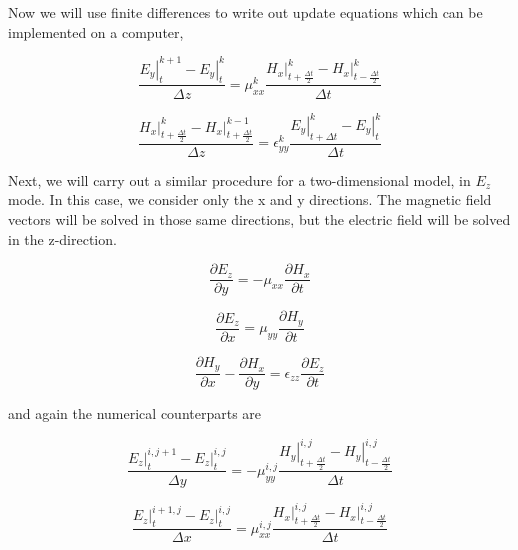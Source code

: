 \documentclass[a4paper]{article}
\begin{document}
Now we will use finite differences to write out update equations which can be implemented on a computer, 

\begin{equation}
    \frac{\left. E_y \right\vert_t^{k+1} - \left. E_y \right\vert_t^{k}}{\Delta z} = \mu_{xx}^{k} \frac{\left. H_x \right\vert_{t+\frac{\Delta t}{2}}^{k} - \left. H_x \right\vert_{t-\frac{\Delta t}{2}}^{k}}{\Delta t}
\end{equation}

\begin{equation}
    \frac{\left. H_x \right\vert_{t+\frac{\Delta t}{2}}^{k} - \left. H_x \right\vert_{t+\frac{\Delta t}{2}}^{k-1}}{\Delta z} = \epsilon_{yy}^{k} \frac{\left. E_y \right\vert_{t+\Delta t}^{k} - \left. E_y \right\vert_{t}^{k}}{\Delta t}
\end{equation}

Next, we will carry out a similar procedure for a two-dimensional model, in $E_z$ mode. In this case, we consider only the x and y directions. The magnetic field vectors will be solved in those same directions, but the electric field will be solved in the z-direction. 

\begin{equation}
    \frac{\partial E_z}{\partial y} = - \mu_{xx} \frac{\partial H_x}{\partial t}
\end{equation}

\begin{equation}
    \frac{\partial E_z}{\partial x} = \mu_{yy} \frac{\partial H_y}{\partial t}
\end{equation}

\begin{equation}
    \frac{\partial H_y}{\partial x} - \frac{\partial H_x}{\partial y} = \epsilon_{zz} \frac{\partial E_z}{\partial t}
\end{equation}

and again the numerical counterparts are

\begin{equation}
    \frac{\left. E_z \right\vert_{t}^{i,j+1} - \left. E_z \right\vert_{t}^{i,j}}{\Delta y} = - \mu_{yy}^{i,j} \frac{\left. H_y \right\vert_{t+\frac{\Delta t}{2}}^{i,j} - \left. H_y \right\vert_{t-\frac{\Delta t}{2}}^{i,j}}{\Delta t}
\end{equation}

\begin{equation}
    \frac{\left. E_z \right\vert_{t}^{i+1,j} - \left. E_z \right\vert_{t}^{i,j}}{\Delta x} = \mu_{xx}^{i,j} \frac{\left. H_x \right\vert_{t+\frac{\Delta t}{2}}^{i,j} - \left. H_x \right\vert_{t-\frac{\Delta t}{2}}^{i,j}}{\Delta t}
\end{equation}
\end{document}
